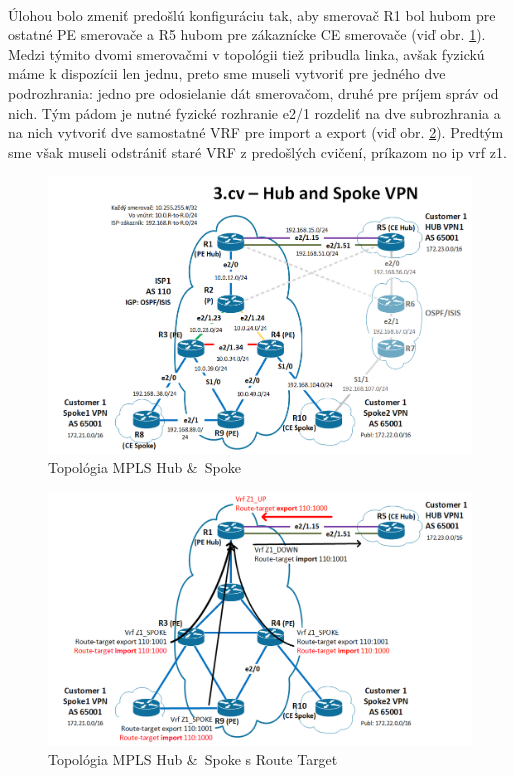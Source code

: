 \documentclass[12pt,twoside,a4paper]{report}
\begin{document}
\paragraph{}
Úlohou bolo zmeniť predošlú konfiguráciu tak, aby smerovač R1 bol hubom pre ostatné PE smerovače a R5 hubom pre zákaznícke CE smerovače (viď obr. \ref{fig:mpls_hub_spoke_topo}). Medzi týmito dvomi smerovačmi v topológii tiež pribudla linka, avšak fyzickú máme k dispozícii len jednu, preto sme museli vytvoriť pre jedného dve podrozhrania: jedno pre odosielanie dát  smerovačom, druhé pre príjem správ od nich. Tým pádom je nutné fyzické rozhranie e2/1 rozdeliť na dve subrozhrania a na nich vytvoriť dve samostatné VRF pre import a export (viď obr. \ref{fig:mpls_hub_spoke_route_target_topo}). Predtým sme však museli odstrániť staré VRF z predošlých cvičení, príkazom no ip vrf z1.

\begin{figure}[!htbp]
\centering
\includegraphics[width=14cm,keepaspectratio]{mpls_hub_spoke_topo}
\caption{Topológia MPLS Hub \& Spoke}
\label{fig:mpls_hub_spoke_topo}
\end{figure}

\begin{figure}[!htbp]
\centering
\includegraphics[width=14cm,keepaspectratio]{mpls_hub_spoke_route_target_topo}
\caption{Topológia MPLS Hub \& Spoke s Route Target}
\label{fig:mpls_hub_spoke_route_target_topo}
\end{figure}
\end{document}
